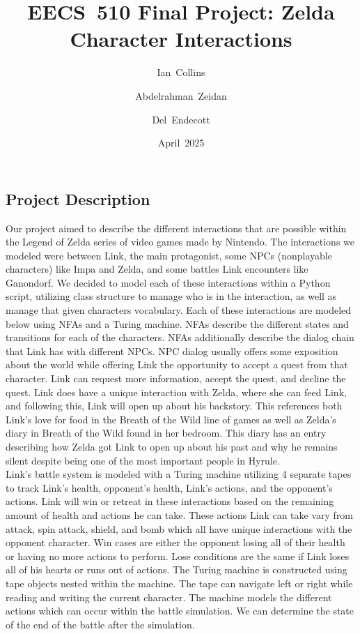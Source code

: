 \documentclass{article}
\title{EECS 510 Final Project: Zelda Character Interactions}
\author{Ian Collins \and Abdelrahman Zeidan \and Del Endecott}
\date{April 2025}
\begin{document}
\maketitle
{}
\pagebreak
\subsection{Project Description}

\quad Our project aimed to describe the different interactions that are possible within the Legend of Zelda series of video games made by Nintendo. The interactions we modeled were between Link, the main protagonist, some NPCs (nonplayable characters) like Impa and Zelda, and some battles Link encounters like Ganondorf. We decided to model each of these interactions within a Python script, utilizing class structure to manage who is in the interaction, as well as manage that given characters vocabulary. Each of these interactions are modeled below using NFAs and a Turing machine. NFAs describe the different states and transitions for each of the characters. NFAs additionally describe the dialog chain that Link has with different NPCs. NPC dialog usually offers some exposition about the world while offering Link the opportunity to accept a quest from that character. Link can request more information, accept the quest, and decline the quest. Link does have a unique interaction with Zelda, where she can feed Link, and following this, Link will open up about his backstory. This references both Link's love for food in the Breath of the Wild line of games as well as Zelda's diary in Breath of the Wild found in her bedroom. This diary has an entry describing how Zelda got Link to open up about his past and why he remains silent despite being one of the most important people in Hyrule.\\
\quad Link's battle system is modeled with a Turing machine utilizing 4 separate tapes to track Link's health, opponent's health, Link's actions, and the opponent's actions. Link will win or retreat in these interactions based on the remaining amount of health and actions he can take. These actions Link can take vary from attack, spin attack, shield, and bomb which all have unique interactions with the opponent character. Win cases are either the opponent losing all of their health or having no more actions to perform. Lose conditions are the same if Link loses all of his hearts or runs out of actions. The Turing machine is constructed using tape objects nested within the machine. The tape can navigate left or right while reading and writing the current character. The machine models the different actions which can occur within the battle simulation. We can determine the state of the end of the battle after the simulation.
\end{document}
